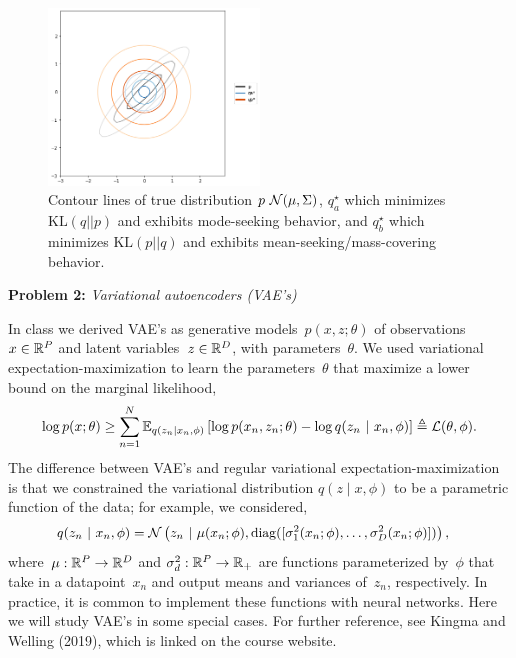 \documentclass[11pt]{article}
\begin{document}
\begin{enumerate}[label=(\alph*)]
    \begin{figure}
        \centering
        \includegraphics[width = 0.5\textwidth]{1c_contour_plot.png}
        \caption{Contour lines of true distribution $p ~ \mathcal{N}(\mu, \Sigma)$,
                $q_a^\star$ which minimizes $\textrm{KL}(q||p)$ and exhibits mode-seeking behavior, and
                $q_b^\star$ which minimizes $\textrm{KL}(p||q)$ and exhibits mean-seeking/mass-covering behavior.}
    \end{figure}
\end{enumerate}



\clearpage

\textbf{Problem 2:}  \textit{Variational autoencoders (VAE's)} 

In class we derived VAE's as generative models~$p(x, z; \theta)$ of observations~$x \in \mathbb{R}^P$ and latent variables~$z \in \mathbb{R}^D$, with parameters~$\theta$.  We used variational expectation-maximization to learn the parameters~$\theta$ that maximize a lower bound on the marginal likelihood,
\begin{align*}
    \log p(x; \theta) \geq \sum_{n=1}^N \mathbb{E}_{q(z_n | x_n, \phi)}\left[\log p(x_n, z_n; \theta) - \log q(z_n ~\vert~ x_n, \phi) \right] \triangleq \mathcal{L}(\theta, \phi).
\end{align*}
The difference between VAE's and regular variational expectation-maximization is that we constrained the variational distribution $q(z \mid x, \phi)$ to be a parametric function of the data; for example, we considered,
\begin{align*}
    q(z_n ~\vert~ x_n, \phi) &= \mathcal{N} \left(z_n ~\vert~ \mu(x_n; \phi), \mathrm{diag}([\sigma_1^2(x_n; \phi), \ldots, \sigma_D^2(x_n; \phi)]) \right),
\end{align*}
where~$\mu: \mathbb{R}^P \to \mathbb{R}^D$ and $\sigma_d^2: \mathbb{R}^P \to \mathbb{R}_+$ are functions parameterized by~$\phi$ that take in a datapoint~$x_n$ and output means and variances of~$z_n$, respectively.  In practice, it is common to implement these functions with neural networks.  Here we will study VAE's in some special cases.  For further reference, see Kingma and Welling (2019), which is linked on the course website.
\end{document}
